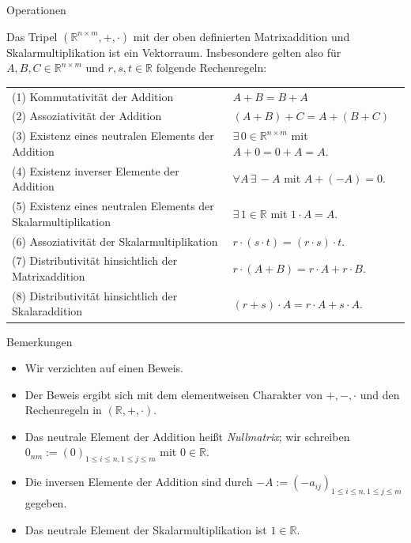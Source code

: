 \documentclass[
  8pt,
  ignorenonframetext,
]{beamer}
\providecommand{\tightlist}{%
  \setlength{\itemsep}{0pt}\setlength{\parskip}{0pt}}
\begin{document}
\begin{frame}{Operationen}
\protect\hypertarget{operationen-9}{}
\footnotesize

\begin{theorem}
\justifying
\normalfont
Das Tripel $(\mathbb{R}^{n \times m}, +, \cdot)$ mit der oben definierten
Matrixaddition und Skalarmultiplikation ist ein Vektorraum. Insbesondere gelten
also für $A,B,C\in \mathbb{R}^{n \times m}$ und $r,s,t\in \mathbb{R}$ folgende
Rechenregeln:
\begin{center}
\renewcommand{\arraystretch}{1.3}
\begin{tabular}{ll}
(1) Kommutativität der Addition
& $A + B = B + A$
\\
(2) Assoziativität der Addition
& $(A + B) + C = A + (B + C)$
\\
(3) Existenz eines neutralen Elements der Addition
& $\exists\, 0 \in \mathbb{R}^{n \times m}$ mit $A + 0 = 0 + A = A$.
\\
(4) Existenz inverser Elemente der Addition
& $\forall A \, \exists\, -A $ mit  $A + (-A) = 0$.
\\
(5) Existenz eines neutralen Elements der Skalarmultiplikation
& $\exists\, 1 \in \mathbb{R}$ mit $1 \cdot A = A$.
\\
(6) Assoziativität der Skalarmultiplikation
& $r \cdot (s \cdot t) = (r \cdot s)\cdot t$.
\\
(7) Distributivität hinsichtlich der Matrixaddition
& $r\cdot (A + B) = r\cdot A + r\cdot B$.
\\
(8) Distributivität hinsichtlich der Skalaraddition
& $(r + s)\cdot A = r\cdot A + s\cdot A$.
\end{tabular}
\end{center}
\end{theorem}

Bemerkungen

\begin{itemize}
\tightlist
\item
  Wir verzichten auf einen Beweis.
\item
  Der Beweis ergibt sich mit dem elementweisen Charakter von
  \(+,-,\cdot\) und den Rechenregeln in \((\mathbb{R},+,\cdot)\).
\item
  Das neutrale Element der Addition heißt \emph{Nullmatrix}; wir
  schreiben \(0_{nm} := (0)_{1\le i \le n, 1 \le j \le m}\) mit
  \(0\in \mathbb{R}\).
\item
  Die inversen Elemente der Addition sind durch
  \(-A := (-a_{ij})_{1\le i \le n, 1 \le j \le m}\) gegeben.
\item
  Das neutrale Element der Skalarmultiplikation ist
  \(1 \in \mathbb{R}\).
\end{itemize}
\end{frame}
\end{document}
